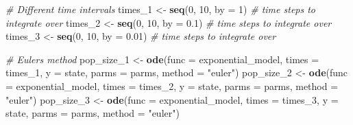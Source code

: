 \documentclass[
]{book}
\newenvironment{Shaded}{\begin{snugshade}}{\end{snugshade}}
\newcommand{\AttributeTok}[1]{\textcolor[rgb]{0.13,0.29,0.53}{#1}}
\newcommand{\CommentTok}[1]{\textcolor[rgb]{0.56,0.35,0.01}{\textit{#1}}}
\newcommand{\DecValTok}[1]{\textcolor[rgb]{0.00,0.00,0.81}{#1}}
\newcommand{\FloatTok}[1]{\textcolor[rgb]{0.00,0.00,0.81}{#1}}
\newcommand{\FunctionTok}[1]{\textcolor[rgb]{0.13,0.29,0.53}{\textbf{#1}}}
\newcommand{\NormalTok}[1]{#1}
\newcommand{\OtherTok}[1]{\textcolor[rgb]{0.56,0.35,0.01}{#1}}
\newcommand{\StringTok}[1]{\textcolor[rgb]{0.31,0.60,0.02}{#1}}
\begin{document}
\begin{Shaded}
\begin{Highlighting}[]
\CommentTok{\# Different time intervals}
\NormalTok{times\_1 }\OtherTok{\textless{}{-}} \FunctionTok{seq}\NormalTok{(}\DecValTok{0}\NormalTok{, }\DecValTok{10}\NormalTok{, }\AttributeTok{by =} \DecValTok{1}\NormalTok{)  }\CommentTok{\# time steps to integrate over}
\NormalTok{times\_2 }\OtherTok{\textless{}{-}} \FunctionTok{seq}\NormalTok{(}\DecValTok{0}\NormalTok{, }\DecValTok{10}\NormalTok{, }\AttributeTok{by =} \FloatTok{0.1}\NormalTok{)  }\CommentTok{\# time steps to integrate over}
\NormalTok{times\_3 }\OtherTok{\textless{}{-}} \FunctionTok{seq}\NormalTok{(}\DecValTok{0}\NormalTok{, }\DecValTok{10}\NormalTok{, }\AttributeTok{by =} \FloatTok{0.01}\NormalTok{)  }\CommentTok{\# time steps to integrate over}

\CommentTok{\# Euler\textquotesingle{}s method}
\NormalTok{pop\_size\_1 }\OtherTok{\textless{}{-}} \FunctionTok{ode}\NormalTok{(}\AttributeTok{func =}\NormalTok{ exponential\_model, }\AttributeTok{times =}\NormalTok{ times\_1, }\AttributeTok{y =}\NormalTok{ state, }\AttributeTok{parms =}\NormalTok{ parms, }\AttributeTok{method =} \StringTok{"euler"}\NormalTok{)}
\NormalTok{pop\_size\_2 }\OtherTok{\textless{}{-}} \FunctionTok{ode}\NormalTok{(}\AttributeTok{func =}\NormalTok{ exponential\_model, }\AttributeTok{times =}\NormalTok{ times\_2, }\AttributeTok{y =}\NormalTok{ state, }\AttributeTok{parms =}\NormalTok{ parms, }\AttributeTok{method =} \StringTok{"euler"}\NormalTok{)}
\NormalTok{pop\_size\_3 }\OtherTok{\textless{}{-}} \FunctionTok{ode}\NormalTok{(}\AttributeTok{func =}\NormalTok{ exponential\_model, }\AttributeTok{times =}\NormalTok{ times\_3, }\AttributeTok{y =}\NormalTok{ state, }\AttributeTok{parms =}\NormalTok{ parms, }\AttributeTok{method =} \StringTok{"euler"}\NormalTok{)}


\end{Highlighting}
\end{Shaded}
\end{document}
